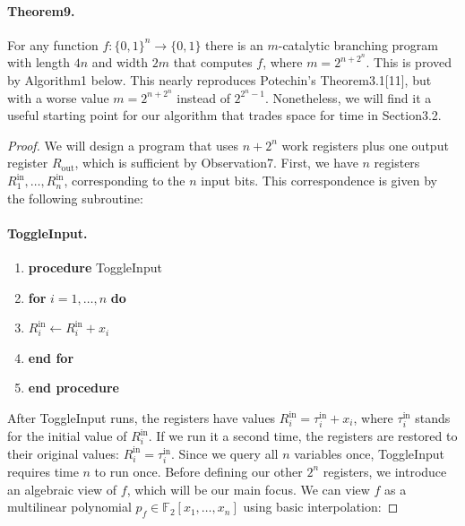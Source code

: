 \documentclass[10pt,a4paper]{article}
\begin{document}
\paragraph{Theorem9.} For any function $f:\{0,1\}^n\to\{0,1\}$ there is an $m$-catalytic branching program with length $4n$ and width $2m$ that computes $f$, where $m=2^{n+2^n}$.
This is proved by Algorithm1 below. This nearly reproduces Potechin's Theorem3.1[11], but with a worse value $m=2^{n+2^n}$ instead of $2^{2^n-1}$. Nonetheless, we will find it a useful starting point for our algorithm that trades space for time in Section3.2.
\begin{proof}
We will design a program that uses $n+2^n$ work registers plus one output register $R_{\mathrm{out}}$, which is sufficient by Observation7. First, we have $n$ registers $R^{\mathrm{in}}_1,\ldots,R^{\mathrm{in}}_n$, corresponding to the $n$ input bits. This correspondence is given by the following subroutine:
\paragraph{ToggleInput.}
\begin{enumerate}[label=\arabic*:]
\item \textbf{procedure} ToggleInput
\item \textbf{for} $i=1,\ldots,n$ \textbf{do}
\item $R_i^{\mathrm{in}}\leftarrow R_i^{\mathrm{in}}+x_i$
\item \textbf{end for}
\item \textbf{end procedure}
\end{enumerate}
After ToggleInput runs, the registers have values $R_i^{\mathrm{in}}=\tau_i^{\mathrm{in}}+x_i$, where $\tau_i^{\mathrm{in}}$ stands for the initial value of $R_i^{\mathrm{in}}$. If we run it a second time, the registers are restored to their original values: $R_i^{\mathrm{in}}=\tau_i^{\mathrm{in}}$. Since we query all $n$ variables once, ToggleInput requires time $n$ to run once.
Before defining our other $2^n$ registers, we introduce an algebraic view of $f$, which will be our main focus. We can view $f$ as a multilinear polynomial $p_f\in\mathbb F_2[x_1,\ldots,x_n]$ using basic interpolation:

\end{proof}
\end{document}
